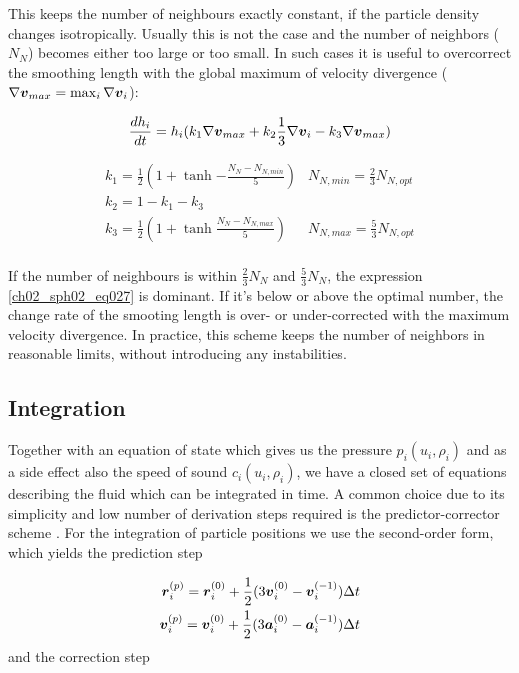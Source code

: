 This keeps the number of neighbours exactly constant, if the particle density changes isotropically. Usually this is not the case and the number of neighbors ($N_N$) becomes either too large or too small. In such cases it is useful to overcorrect the smoothing length with the global maximum of velocity divergence ($\nabla \boldsymbol{v}_{max} = \max_{i} \nabla \boldsymbol{v}_i$):

\begin{equation}
\label{ch02_sph01_eq028}
\frac{d h_i}{d t} = h_i ( k_1 \nabla \boldsymbol{v}_{max}+ k_2 \frac{1}{3} \nabla\boldsymbol{v}_i - k_3 \nabla \boldsymbol{v}_{max} )
\end{equation}

\begin{equation}
\label{ch02_sph01_eq029}
\begin{array}{ll}
k_1 = \frac{1}{2} (1 + \tanh{- \frac{N_N - N_{N,min}}{5}} ) & N_{N,min} = \frac{2}{3} N_{N,opt} \\
k_2 = 1 - k_1 - k_3 & \\
k_3 = \frac{1}{2} (1 + \tanh{\frac{N_N - N_{N,max}}{5}} ) & N_{N,max} = \frac{5}{3} N_{N,opt}\\
\end{array}
\end{equation}

If the number of neighbours is within $\frac{2}{3} N_N$ and $\frac{5}{3} N_N$, the expression \ref{ch02_sph02_eq027} is dominant. If it's below or above the optimal number, the change rate of the smooting length is over- or under-corrected with the maximum velocity divergence. In practice, this scheme keeps the number of neighbors in reasonable limits, without introducing any instabilities.

\subsection{Integration}
Together with an equation of state which gives us the pressure $p_i(u_i, \rho_i)$ and as a side effect also the speed of sound $c_i(u_i, \rho_i)$, we have a closed set of equations describing the fluid which can be integrated in time. A common choice due to its simplicity and low number of derivation steps required is the predictor-corrector scheme \citep{Press2002nrc..book.....P}. For the integration of particle positions we use the second-order form, which yields the prediction step

\begin{eqnarray}
\label{ch02_sph02_eq019}
\boldsymbol{r}_i^{(p)} = \boldsymbol{r}_i^{(0)} + \frac{1}{2} ( 3 \boldsymbol{v}_i^{(0)} - \boldsymbol{v}_i^{(-1)} )\Delta t \\
\boldsymbol{v}_i^{(p)} = \boldsymbol{v}_i^{(0)} + \frac{1}{2} ( 3 \boldsymbol{a}_i^{(0)} - \boldsymbol{a}_i^{(-1)} )\Delta t
\end{eqnarray}
and the correction step

